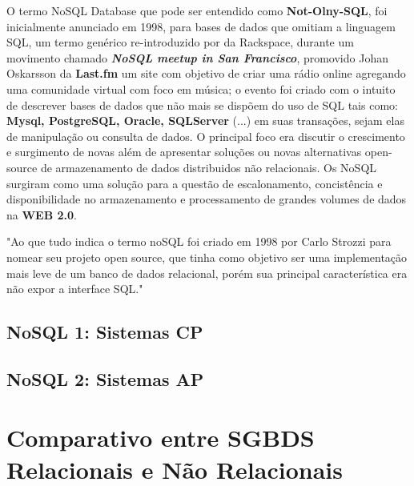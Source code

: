 O termo NoSQL Database que pode ser entendido como \textbf{Not-Olny-SQL}, foi inicialmente anunciado em 1998, para bases de dados que omitiam a linguagem SQL, um termo genérico re-introduzido por \cite{EVANS} da Rackspace,
durante um movimento chamado \textbf{\textit{ NoSQL meetup in San Francisco}}, promovido Johan Oskarsson da \textbf{ Last.fm } um site com objetivo de criar uma rádio online agregando uma comunidade virtual com foco em música; o evento foi criado com o intuito de descrever 
bases de dados que não mais se dispõem do uso de SQL tais como:\textbf{ Mysql, PostgreSQL, Oracle, SQLServer }(...) em suas transações, sejam elas de manipulação ou consulta de dados. O principal foco era discutir o crescimento e surgimento de novas 
além de apresentar soluções ou novas alternativas open-source de armazenamento de dados distribuidos não relacionais. Os NoSQL surgiram como uma solução para a questão de escalonamento, concistência e disponibilidade no
armazenamento e processamento de grandes volumes de dados na \textbf{WEB 2.0}.

"Ao que tudo indica o termo noSQL foi criado em 1998 por Carlo Strozzi para nomear seu projeto open source, que tinha como objetivo ser uma implementação mais leve de um banco de dados relacional, 
porém sua principal característica era não expor a interface SQL."\cite{DEVMEDIA}


\subsection{ NoSQL 1: Sistemas CP }

\subsection{ NoSQL 2: Sistemas AP }

\section{Comparativo entre SGBDS Relacionais e Não Relacionais}
